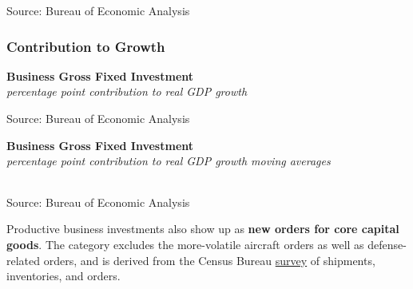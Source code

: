 \documentclass{report}
\makeatletter
\newcommand{\tbllink}[1]{\href{https://raw.githubusercontent.com/bdecon/US-chartbook/master/chartbook/data/#1}{\faTable}}
\newcommand*\short[1]{\expandafter\@gobbletwo\number\numexpr#1\relax}
\newcommand{\sbar}[4]{
		\addplot[ybar stacked, bar width=2.3pt, draw opacity=0, fill=#1] 
			table [x=#2, y=#3, col sep=comma]{#4};}
\newcommand{\dateaxisticks}{
		date coordinates in=x, axis line style={draw=none},
		xmax={2023-11-30},
		max space between ticks=40,	    
		xtick={{1990-01-01}, {1992-01-01}, {1994-01-01}, 
			{1996-01-01}, {1998-01-01}, {2000-01-01}, 
			{2002-01-01}, {2004-01-01}, {2006-01-01},
			{2008-01-01}, {2010-01-01}, {2012-01-01}, {2014-01-01},
		    {2016-01-01}, {2018-01-01}, {2020-01-01}, {2022-01-01}, 
		    {2024-01-01}, {2026-01-01}},
		minor xtick={{1989-01-01}, {1991-01-01}, {1993-01-01},
			{1995-01-01}, {1997-01-01}, {1999-01-01}, 
			{2001-01-01}, {2003-01-01}, {2005-01-01}, {2007-01-01},
		    {2009-01-01}, {2011-01-01}, {2013-01-01}, {2015-01-01},
		    {2017-01-01}, {2019-01-01}, {2021-01-01}, {2023-01-01}, 
		    {2025-01-01}, {2027-01-01}},
		enlarge y limits={0.06}, enlarge x limits={0.01},
		xticklabel style={align=center, yshift=-2pt}, tick label style={inner sep=0pt},
		}
\newcommand{\bbar}[2]{extra #1 ticks = {{#2}}, extra #1 tick labels = ,
		extra #1 tick style = {grid=major, grid style={thick, black!25}},}
\newcommand{\rbars}{
		\fill[color=black!10] (axis cs:{1990-07-01},\pgfkeysvalueof{/pgfplots/ymin}) rectangle 
			(axis cs:{1991-03-01}, \pgfkeysvalueof{/pgfplots/ymax});
		\fill[color=black!10] (axis cs:{2007-12-01},\pgfkeysvalueof{/pgfplots/ymin}) rectangle 
			(axis cs:{2009-07-01}, \pgfkeysvalueof{/pgfplots/ymax});
		\fill[color=black!10] (axis cs:{2001-03-01},\pgfkeysvalueof{/pgfplots/ymin}) rectangle 
			(axis cs:{2001-11-01}, \pgfkeysvalueof{/pgfplots/ymax});
		\fill[color=black!10] (axis cs:{2020-02-01},\pgfkeysvalueof{/pgfplots/ymin}) rectangle 
			(axis cs:{2020-05-01}, \pgfkeysvalueof{/pgfplots/ymax});}
\makeatother
\begin{document}
{\begin{minipage}{0.38\textwidth}
\footnotesize{Source: Bureau of Economic Analysis} \hfill \tbllink{businvsh.csv}
\end{minipage}

\begin{minipage}{0.76\textwidth}
\subsubsection*{Contribution to Growth}
\vspace{-0.5mm}
\small  
\vspace{1mm}

\normalsize \textbf{Business Gross Fixed Investment}\\
\footnotesize{\textit{percentage point contribution to real GDP growth}}
\vspace{3.5cm}

\hspace{2mm} 

\footnotesize{Source: Bureau of Economic Analysis} \hfill \tbllink{businv.csv}
\vspace{2mm}

\normalsize \textbf{Business Gross Fixed Investment}\\
\footnotesize{\textit{percentage point contribution to real GDP growth \hspace{32mm} moving averages}}\\ 
 \setlength{\tabcolsep}{3.6pt} \color{black!90}
		{\renewcommand{\arraystretch}{1.56}
\hspace*{-2mm} \begin{tabular}{p{40.6mm} R{6.7mm} R{6.7mm} R{6.7mm} R{6.7mm} R{6.7mm} 
		   R{7.6mm} R{6.7mm} R{6.7mm} }
			  \hline
		\end{tabular}} \vspace{-2mm}
				
\footnotesize{Source: Bureau of Economic Analysis}
\end{minipage}
\newpage
{}  
\begin{minipage}{0.32\textwidth}
\small Productive business investments also show up as \textbf{new orders for core capital goods}. The category excludes the more-volatile aircraft orders as well as defense-related orders, and is derived from the Census Bureau \href{https://www.census.gov/manufacturing/m3/index.html}{survey} of shipments, inventories, and orders.  


\end{minipage}}
\end{document}
